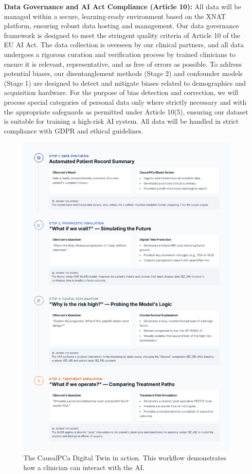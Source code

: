 \documentclass[11pt, a4paper]{article}
\begin{document}
\textbf{Data Governance and AI Act Compliance (Article 10):} All data will be managed within a secure, learning-ready environment based on the XNAT platform, ensuring robust data hosting and management. Our data governance framework is designed to meet the stringent quality criteria of Article 10 of the EU AI Act. The data collection is overseen by our clinical partners, and all data undergoes a rigorous curation and verification process by trained clinicians to ensure it is relevant, representative, and as free of errors as possible. To address potential biases, our disentanglement methods (Stage 2) and confounder models (Stage 1) are designed to detect and mitigate biases related to demographics and acquisition hardware. For the purpose of bias detection and correction, we will process special categories of personal data only where strictly necessary and with the appropriate safeguards as permitted under Article 10(5), ensuring our dataset is suitable for training a high-risk AI system. All data will be handled in strict compliance with GDPR and ethical guidelines.

\begin{figure}[H]
    \centering
    \includegraphics[trim=5mm 15mm 5mm 25mm, %
        clip,                     %
        width=\textwidth]{wf.png}
    \caption{The CausalPCa Digital Twin in action. This workflow demonstrates how a clinician can interact with the AI.}
    \label{fig:workflow}
\end{figure}
\end{document}
